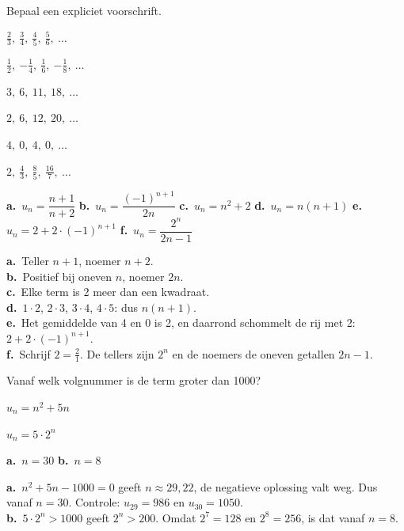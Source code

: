 \begin{oefeningen}
\begin{oefening}[2]
Bepaal een expliciet voorschrift.
\begin{reeks}
  \item $\tfrac23,\ \tfrac34,\ \tfrac45,\ \tfrac56,\ \ldots$
  \item $\tfrac12,\ {-\tfrac14},\ \tfrac16,\ {-\tfrac18},\ \ldots$
  \item $3,\ 6,\ 11,\ 18,\ \ldots$
  \item $2,\ 6,\ 12,\ 20,\ \ldots$
  \item $4,\ 0,\ 4,\ 0,\ \ldots$
  \item $2,\ \tfrac43,\ \tfrac85,\ \tfrac{16}{7},\ \ldots$
\end{reeks}
\begin{solution}
\textbf{a.}~$u_n=\dfrac{n+1}{n+2}$ \quad \textbf{b.}~$u_n=\dfrac{(-1)^{n+1}}{2n}$ \quad \textbf{c.}~$u_n=n^2+2$ \quad \textbf{d.}~$u_n=n(n+1)$ \quad \textbf{e.}~$u_n=2+2\cdot(-1)^{n+1}$ \quad \textbf{f.}~$u_n=\dfrac{2^n}{2n-1}$
\end{solution}
\begin{fullsolution}
\textbf{a.}~Teller $n+1$, noemer $n+2$.\\
\textbf{b.}~Positief bij oneven $n$, noemer $2n$.\\
\textbf{c.}~Elke term is 2 meer dan een kwadraat.\\
\textbf{d.}~$1\cdot 2$, $2\cdot 3$, $3\cdot 4$, $4\cdot 5$: dus $n(n+1)$.\\
\textbf{e.}~Het gemiddelde van 4 en 0 is 2, en daarrond schommelt de rij met 2: $2+2\cdot(-1)^{n+1}$.\\
\textbf{f.}~Schrijf $2=\tfrac21$. De tellers zijn $2^n$ en de noemers de oneven getallen $2n-1$.
\end{fullsolution}
\end{oefening}

\begin{oefening}[2]
Vanaf welk volgnummer is de term groter dan 1000?
\begin{reeks}[2]
  \item $u_n = n^2 + 5n$
  \item $u_n = 5 \cdot 2^n$
\end{reeks}
\begin{solution}
\textbf{a.}~$n=30$ \quad \textbf{b.}~$n=8$
\end{solution}
\begin{fullsolution}
\textbf{a.}~$n^2+5n-1000=0$ geeft $n\approx 29{,}22$, de negatieve oplossing valt weg. Dus vanaf $n=30$. Controle: $u_{29}=986$ en $u_{30}=1050$.\\
\textbf{b.}~$5\cdot 2^n>1000$ geeft $2^n>200$. Omdat $2^7=128$ en $2^8=256$, is dat vanaf $n=8$.
\end{fullsolution}
\end{oefening}


\end{oefeningen}
